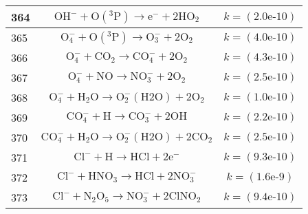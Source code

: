 \begin{longtable}{| m{} | m{}| m{} |}
\hline
 364 & $$ \mathrm{OH^-} + \mathrm{O(^3P)}\longrightarrow \mathrm{e^-} + 2\mathrm{HO_2} $$ & $$k = (\textrm{2.0e-10}) $$ \\
\hline
 365 & $$ \mathrm{O_4^-} + \mathrm{O(^3P)}\longrightarrow \mathrm{O_3^-} + 2\mathrm{O_2} $$ & $$k = (\textrm{4.0e-10}) $$ \\
\hline
 366 & $$ \mathrm{O_4^-} + \mathrm{CO_2}\longrightarrow \mathrm{CO_4^-} + 2\mathrm{O_2} $$ & $$k = (\textrm{4.3e-10}) $$ \\
\hline
 367 & $$ \mathrm{O_4^-} + \mathrm{NO}\longrightarrow \mathrm{NO_3^-} + 2\mathrm{O_2} $$ & $$k = (\textrm{2.5e-10}) $$ \\
\hline
 368 & $$ \mathrm{O_4^-} + \mathrm{H_2O}\longrightarrow \mathrm{O_2^-(H2O)} + 2\mathrm{O_2} $$ & $$k = (\textrm{1.0e-10}) $$ \\
\hline
 369 & $$ \mathrm{CO_4^-} + \mathrm{H}\longrightarrow \mathrm{CO_3^-} + 2\mathrm{OH} $$ & $$k = (\textrm{2.2e-10}) $$ \\
\hline
 370 & $$ \mathrm{CO_4^-} + \mathrm{H_2O}\longrightarrow \mathrm{O_2^-(H2O)} + 2\mathrm{CO_2} $$ & $$k = (\textrm{2.5e-10}) $$ \\
\hline
 371 & $$ \mathrm{Cl^-} + \mathrm{H}\longrightarrow \mathrm{HCl} + 2\mathrm{e^-} $$ & $$k = (\textrm{9.3e-10}) $$ \\
\hline
 372 & $$ \mathrm{Cl^-} + \mathrm{HNO_3}\longrightarrow \mathrm{HCl} + 2\mathrm{NO_3^-} $$ & $$k = (\textrm{1.6e-9}) $$ \\
\hline
 373 & $$ \mathrm{Cl^-} + \mathrm{N_2O_5}\longrightarrow \mathrm{NO_3^-} + 2\mathrm{ClNO_2} $$ & $$k = (\textrm{9.4e-10}) $$ \\
\hline
\end{longtable}

